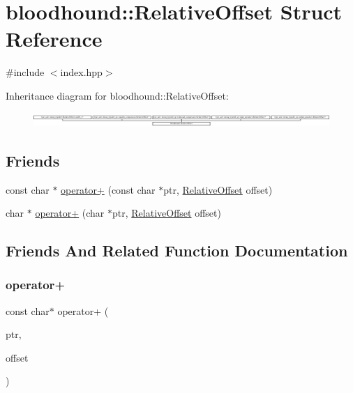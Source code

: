 \hypertarget{structbloodhound_1_1RelativeOffset}{}\section{bloodhound\+:\+:Relative\+Offset Struct Reference}
\label{structbloodhound_1_1RelativeOffset}


{\ttfamily \#include $<$index.\+hpp$>$}

Inheritance diagram for bloodhound\+:\+:Relative\+Offset\+:\begin{figure}[H]
\begin{center}
\leavevmode
\includegraphics[height=0.534606cm]{structbloodhound_1_1RelativeOffset}
\end{center}
\end{figure}
\subsection*{Friends}
\begin{DoxyCompactItemize}
\item 
const char $\ast$ \mbox{\hyperlink{structbloodhound_1_1RelativeOffset_a878bac48143c1d3b2597273daca07f25}{operator+}} (const char $\ast$ptr, \mbox{\hyperlink{structbloodhound_1_1RelativeOffset}{Relative\+Offset}} offset)
\item 
char $\ast$ \mbox{\hyperlink{structbloodhound_1_1RelativeOffset_aef76589aeb04376cde5936475652ceda}{operator+}} (char $\ast$ptr, \mbox{\hyperlink{structbloodhound_1_1RelativeOffset}{Relative\+Offset}} offset)
\end{DoxyCompactItemize}


\subsection{Friends And Related Function Documentation}
\mbox{\label{structbloodhound_1_1RelativeOffset_a878bac48143c1d3b2597273daca07f25}} 
\subsubsection{\texorpdfstring{operator+}{operator+}\hspace{0.1cm}{\footnotesize\ttfamily [1/2]}}
{\footnotesize\ttfamily const char$\ast$ operator+ (\begin{DoxyParamCaption}\item[{const char $\ast$}]{ptr,  }\item[{\mbox{\hyperlink{structbloodhound_1_1RelativeOffset}{Relative\+Offset}}}]{offset }\end{DoxyParamCaption})\hspace{0.3cm}{\ttfamily [friend]}}

